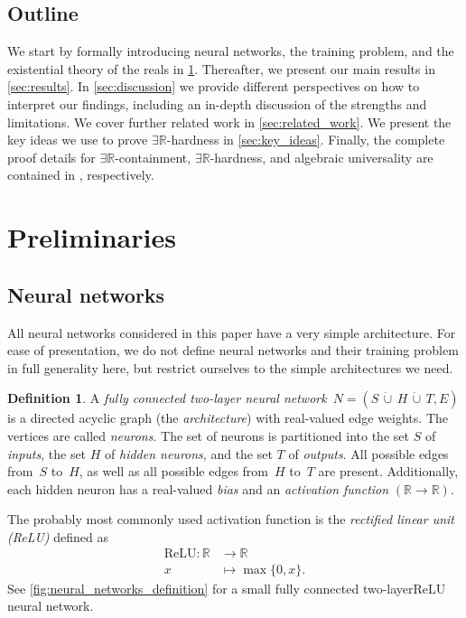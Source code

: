 \documentclass[11pt]{article}
\numberwithin{equation}{section}
\theoremstyle{definition}
\newtheorem{definition}[theorem]{Definition}
\theoremstyle{plain}
\newcommand{\R}{\mathbb R}
\newcommand{\ER}{\texorpdfstring{\ensuremath{\exists\R}}{ER}\xspace}
\newcommand{\fullyconnected}{fully connected\xspace}
\newcommand{\twolayer}{two-layer\xspace}
\newcommand{\ReLU}{\ensuremath{\mathrm{ReLU}}\xspace}
\theoremstyle{plain}
\begin{document}
\subsection{Outline}
We start by formally introducing neural networks, the training problem, and the existential theory of the reals in \cref{sec:preliminaries}.
Thereafter, we present our main results in \cref{sec:results}.
In \cref{sec:discussion} we provide different perspectives on how to interpret our findings, including an in-depth discussion of the strengths and limitations.
We cover further related work in \cref{sec:related_work}.
We present the key ideas we use to prove \ER-hardness in \cref{sec:key_ideas}.
Finally, the complete proof details for \ER-containment, \ER-hardness, and algebraic universality are contained in , respectively.



\section{Preliminaries}
\label{sec:preliminaries}

\subsection{Neural networks}
All neural networks considered in this paper have a very simple architecture.
For ease of presentation, we do not define neural networks and their training problem in full generality here, but restrict ourselves to the simple architectures we need.

\begin{definition}
    A \emph{\fullyconnected \twolayer neural network}~$N = (S \,\dot{\cup}\, H \,\dot{\cup}\, T, E)$ is a directed acyclic graph (the \emph{architecture}) with real-valued edge weights.
%
%
The vertices are called \emph{neurons}.  The set of neurons is partitioned into
%
%
the set $S$ of \emph{inputs}, the set $H$ of \emph{hidden neurons}, and the
set $T$ of \emph{outputs}.  %
    All possible edges from~$S$ to~$H$, as well as all possible edges from~$H$ to~$T$ are present.
    Additionally, each hidden neuron has a real-valued \emph{bias} and an 
    \emph{activation function} $(\R \to \R)$.
\end{definition}

The probably most commonly used activation function \cite{Arora2018_Understanding,Glorot2011_DeepSparse,Goodfellow2016_DeepLearning} is the \emph{rectified linear unit (ReLU)} defined as
\begin{align*}
    \ReLU \colon \R &\to \R \\
    x &\mapsto \max\{0,x\}
    \text{.}
\end{align*}
See \cref{fig:neural_networks_definition} for a small \fullyconnected \twolayer \ReLU neural network.
\end{document}
